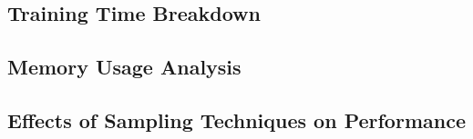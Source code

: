 \subsection{Training Time Breakdown}
\label{sec:training_time_breakdown}

\subsection{Memory Usage Analysis}
\label{sec:memory_usage_analysis}

\subsection{Effects of Sampling Techniques on Performance}
\label{sec:effects_of_sampling_techniques_on_performance}